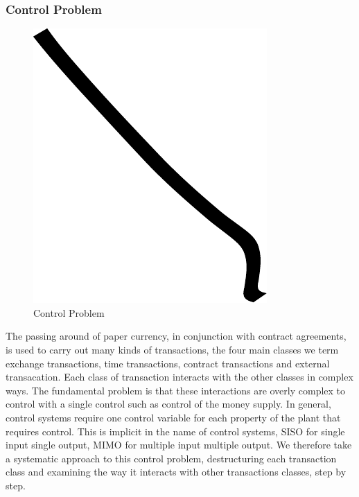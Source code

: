 \subsubsection{Control Problem}

\begin{figure}
\centering
\includegraphics{img/example.pdf}
\caption{Control Problem}
\end{figure}

The passing around of paper currency, in conjunction with contract agreements, is used to carry
out many kinds of transactions, the four main classes we term exchange transactions, time
transactions, contract transactions and external transacation. Each class of transaction interacts
with the other classes in complex ways. The fundamental problem is that these interactions are
overly complex to control with a single control such as control of the money supply. In general,
control systems require one control variable for each property of the plant that requires control.
This is implicit in the name of control systems, SISO for single input single output, MIMO for
multiple input multiple output. We therefore take a systematic approach to this control problem,
destructuring each transaction class and examining the way it interacts with other transactions
classes, step by step.

